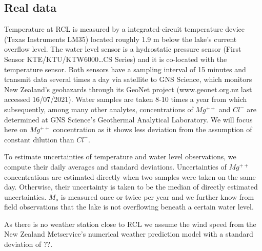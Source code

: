 \documentclass{bmc_template/bmcart}
\begin{document}
\subsection*{Real data}\label{realdata}
Temperature at RCL is measured by a integrated-circuit temperature device
(Texas Instruments LM35) located roughly 1.9 m below the lake's current
overflow level. The water level sensor is a hydrostatic pressure sensor (First
Sensor KTE/KTU/KTW6000\ldots CS Series) and it is co-located with the
temperature sensor. Both sensors have a sampling interval of 15 minutes and
transmit data several times a day via satellite to GNS Science, which monitors
New Zealand's geohazards through its GeoNet project (www.geonet.org.nz
 last accessed 16/07/2021).
Water samples are taken 8-10 times a year from which subsequently, among many
other analytes, concentrations of $Mg^{++}$ and $Cl^-$ are determined at GNS
Science's Geothermal Analytical Laboratory. We will focus here on $Mg^{++}$
concentration as it shows less deviation from the assumption of constant
dilution than $Cl^-$.
 
To estimate uncertainties of temperature and water level observations, we 
compute their daily averages and standard deviations. Uncertainties of $Mg^{++}$
concentrations are estimated directly when two samples were taken on the same day.
Otherwise, their uncertainty is taken to be the median of directly estimated
uncertainties. $\dot{M_o}$ is measured once or twice per year and we further know
from field observations that the lake is not overflowing beneath a certain water
level. 

As there is no weather station close to RCL we assume the wind speed from the
New Zealand Metservice's numerical weather prediction model with a standard
deviation of ??.

\begin{figure}
\label{inference_result}
\end{figure}
\end{document}
